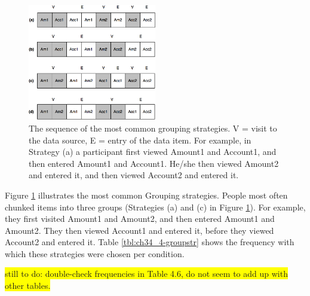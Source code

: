\begin{table}
\begin{itemize}
\begin{figure}[!ht]
  \centering
    \includegraphics[width=0.5\textwidth]{images/Study4/ch34_4-groupstr.png}
      \caption{The sequence of the most common grouping strategies. V = visit to the data source, E = entry of the data item. For example, in Strategy (a) a participant first viewed Amount1 and Account1, and then entered Amount1 and Account1. He/she then viewed Amount2 and entered it, and then viewed Account2 and entered it.}
          \label{fig:ch34_4-groupstr}
\end{figure}

Figure \ref{fig:ch34_4-groupstr} illustrates the most common Grouping strategies. People most often chunked items into three groups (Strategies (a) and (c) in Figure \ref{fig:ch34_4-groupstr}). For example, they first visited Amount1 and Amount2, and then entered Amount1 and Amount2. They then viewed Account1 and entered it, before they viewed Account2 and entered it. Table \ref{tbl:ch34_4-groupstr} shows the frequency with which these strategies were chosen per condition.

 \colorbox{yellow}{still to do: double-check frequencies in Table 4.6, do not seem to add up with other tables.}


\end{itemize}
\end{table}

